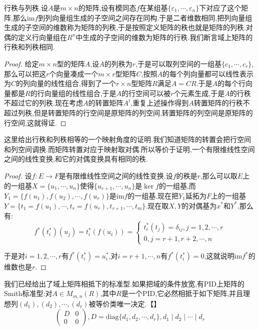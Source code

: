 行秩与列秩.设$A$是$m\times n$的矩阵,设有模同态$f$在某组基$\{\varepsilon_1,\cdots,\varepsilon_n\}$下对应了这个矩阵,那么$\mathrm{im}f$到列向量组生成的子空间之间存在同构.于是二者维数相同,把列向量组生成的子空间的维数称为矩阵的列秩,于是按照定义矩阵的秩也就是矩阵的列秩.对偶的定义行向量组在$R^n$中生成的子空间的维数为矩阵的行秩.我们断言域上矩阵的行秩和列秩相同.
\begin{proof}
	
	给定$m\times n$型的矩阵$A$,设$A$的列秩为$r$,于是可以取列空间的一组基$\{c_1,\cdots,c_r\}$,那么可以把这$r$个向量凑成一个$m\times r$型矩阵$C$,按照$A$的每个列向量都可以线性表示为$C$的列向量的线性组合,得到了一个$r\times n$型矩阵$R$满足$A=CR$.于是$A$的每个行向量都是$R$的行向量组的线性组合,于是$A$的行空间可以被$r$个元素生成,于是$A$的行秩不超过它的列秩.现在考虑$A$的转置矩阵$A^t$,重复上述操作得到$A$转置矩阵的行秩不超过列秩,但是转置矩阵的行空间是原矩阵的列空间,转置矩阵的列空间是原矩阵的行空间,这就得证.
\end{proof}

这里给出行秩和列秩相等的一个映射角度的证明.我们知道矩阵的转置会把行空间和列空间调换.而矩阵转置对应于映射取对偶.所以等价于证明,一个有限维线性空间之间的线性变换,和它的对偶变换具有相同的秩.
\begin{proof}
	
	设$f:E\to F$是有限维线性空间之间的线性变换.设$f$的秩是$r$,那么可以取$E$上的一组基$X=\{u_1,\cdots,u_n\}$使得$\{u_{r+1},\cdots,u_n\}$是$\ker f$的一组基,而$Y_1=\{f(u_1),f(u_2),\cdots,f(u_r)\}$是$\mathrm{im}f$的一组基.现在把$Y_1$延拓为$F$上的一组基$Y=\{t_1=f(u_1),\cdots,t_r=f(u_r),t_{r+1},\cdots,t_m\}$.现在取$X,Y$的对偶基为$x^*$和$Y^*$.那么有:
	$$f^*(t_i^*)(u_j)=t_i^*(f(u_i))=\left\{\begin{array}{c}
	t_i^*(t_j)=\delta_{ij},j=1,2,\cdots,r\\
	0,j=r+1,r+2,\cdots,n
	\end{array}\right.$$
	
	于是对$i=1,2,\cdots,r$有$f^*(t_i^*)=u_i^*$,对$i=r+1,\cdots,n$有$f^*(t_i^*)=0$,这就说明$\mathrm{im}f^*$的维数也是$r$.
\end{proof}

我们已经给出了域上矩阵相抵下的标准型.如果把域的条件放宽,有PID上矩阵的Smith标准型:对$A\in M_{m,n}(R)$,其中$R$是一个PID,它必然相抵于如下矩阵,并且理想列$(d_1),(d_2),\cdots,(d_r)$被等价类唯一决定.【】
$$\left(\begin{array}{cc}
D&0\\
0&0
\end{array}\right),D=\mathrm{diag}\{d_1,d_2,\cdots,d_r\},d_1\mid d_2\mid\cdots\mid d_r$$


